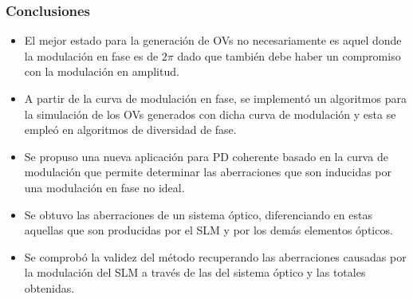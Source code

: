 \documentclass[serif,8pt]{beamer}
\begin{document}
		\begin{frame}
		\frametitle{Conclusiones}
			\begin{itemize}
			\justifying
			\item El mejor estado para la generación de OVs no necesariamente es aquel donde la modulación en fase es de $2\pi$ dado que también debe haber un compromiso con la modulación en amplitud.
			\item A partir de la curva de modulación en fase, se implementó un algoritmos para la simulación de los OVs generados con dicha curva de modulación y esta se empleó en algoritmos de diversidad de fase.
			\item Se propuso una nueva aplicación para PD coherente basado en la curva de modulación que permite determinar las aberraciones que son inducidas por una modulación en fase no ideal.
			\item Se obtuvo las aberraciones de un sistema óptico, diferenciando en estas aquellas que son producidas por el SLM y por los demás elementos ópticos.
			\item Se comprobó la validez del método recuperando las aberraciones causadas por la modulación del SLM a través de las del sistema óptico y las totales obtenidas.
			\end{itemize}
		\end{frame}
		
\end{document}
